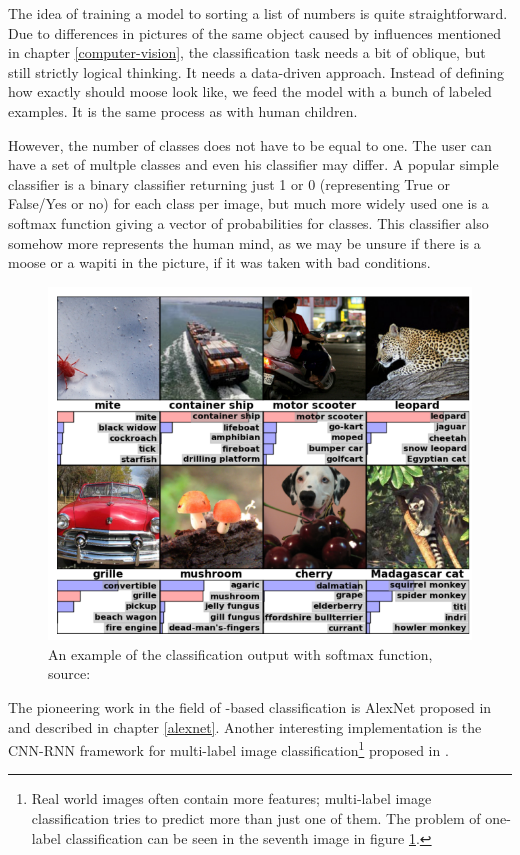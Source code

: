 The idea of training a model to sorting a list of numbers is quite straightforward. Due to differences in pictures of the same object caused by influences mentioned in chapter \ref{computer-vision}, the classification task needs a bit of oblique, but still strictly logical thinking. It needs a data-driven approach. Instead of defining how exactly should moose look like, we feed the model with a bunch of labeled examples. It is the same process as with human children.

However, the number of classes does not have to be equal to one. The user can have a set of multple classes and even his classifier may differ. A popular simple classifier is a binary classifier returning just 1 or 0 (representing True or False/Yes or no) for each class per image, but much more widely used one is a softmax function giving a vector of probabilities for classes. This classifier also somehow more represents the human mind, as we may be unsure if there is a moose or a wapiti in the picture, if it was taken with bad conditions.

\begin{figure}[H]
   \centering
	\includegraphics[width=.8\linewidth]{./pictures/classification.png}
	\caption[Classification example]{An example of the classification output with softmax function, source: \cite{cnn-classification}}
      \label{fig:class}
\end{figure}

The pioneering work in the field of -based classification is AlexNet proposed in \cite{cnn-classification} and described in chapter \ref{alexnet}. Another interesting implementation is the CNN-RNN framework for multi-label image classification\footnote{Real world images often contain more features; multi-label image classification tries to predict more than just one of them. The problem of one-label classification can be seen in the seventh image in figure \ref{fig:class}.} proposed in \cite{multi-classification}.

